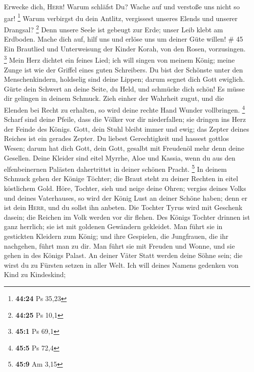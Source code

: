 Erwecke dich, \textsc{Herr}! Warum schläfst Du? Wache auf und verstoße
uns nicht so gar! \footnote{\textbf{44:24} Ps 35,23} 
Warum verbirgst du dein Antlitz, vergissest unseres Elends und unserer
Drangsal? \footnote{\textbf{44:25} Ps 10,1}  Denn unsere
Seele ist gebeugt zur Erde; unser Leib klebt am Erdboden.
 Mache dich auf, hilf uns und erlöse uns um deiner Güte
willen! \# 45  Ein Brautlied und Unterweisung der Kinder
Korah, von den Rosen, vorzusingen. \footnote{\textbf{45:1} Ps 69,1}
 Mein Herz dichtet ein feines Lied; ich will singen von
meinem König; meine Zunge ist wie der Griffel eines guten Schreibers.
 Du bist der Schönste unter den Menschenkindern, holdselig
sind deine Lippen; darum segnet dich Gott ewiglich.  Gürte
dein Schwert an deine Seite, du Held, und schmücke dich schön!
 Es müsse dir gelingen in deinem Schmuck. Zieh einher der
Wahrheit zugut, und die Elenden bei Recht zu erhalten, so wird deine
rechte Hand Wunder vollbringen. \footnote{\textbf{45:5} Ps 72,4}
 Scharf sind deine Pfeile, dass die Völker vor dir
niederfallen; sie dringen ins Herz der Feinde des Königs. 
Gott, dein Stuhl bleibt immer und ewig; das Zepter deines Reiches ist
ein gerades Zepter.  Du liebest Gerechtigkeit und hassest
gottlos Wesen; darum hat dich Gott, dein Gott, gesalbt mit Freudenöl
mehr denn deine Gesellen.  Deine Kleider sind eitel
Myrrhe, Aloe und Kassia, wenn du aus den elfenbeinernen Palästen
dahertrittst in deiner schönen Pracht. \footnote{\textbf{45:9} Am 3,15}
 In deinem Schmuck gehen der Könige Töchter; die Braut
steht zu deiner Rechten in eitel köstlichem Gold.  Höre,
Tochter, sieh und neige deine Ohren; vergiss deines Volks und deines
Vaterhauses,  so wird der König Lust an deiner Schöne
haben; denn er ist dein \textsc{Herr}, und du sollst ihn anbeten.
 Die Tochter Tyrus wird mit Geschenk dasein; die Reichen
im Volk werden vor dir flehen.  Des Königs Tochter
drinnen ist ganz herrlich; sie ist mit goldenen Gewändern gekleidet.
 Man führt sie in gestickten Kleidern zum König; und ihre
Gespielen, die Jungfrauen, die ihr nachgehen, führt man zu dir.
 Man führt sie mit Freuden und Wonne, und sie gehen in
des Königs Palast.  An deiner Väter Statt werden deine
Söhne sein; die wirst du zu Fürsten setzen in aller Welt.
 Ich will deines Namens gedenken von Kind zu Kindeskind;
